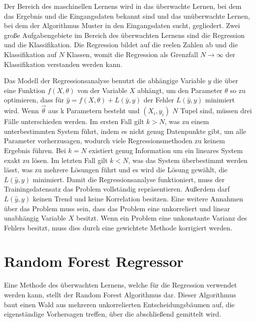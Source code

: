 Der Bereich des maschinellen Lernens wird in das überwachte Lernen, bei dem das Ergebnis und die Eingangsdaten bekannt
sind und das unüberwachte Lernen, bei dem der Algorithmus Muster in den Eingangsdaten sucht, gegliedert.
Zwei große Aufgabengebiete im Bereich des überwachten Lernens sind die Regression und die Klassifikation. Die Regression bildet
auf die reelen Zahlen ab und die Klassifikation auf $N$ Klassen, womit die Regression als Grenzfall $N \to \infty$ der Klassifikation
verstanden werden kann.

Das Modell der Regressionsanalyse benutzt die abhängige Variable $y$ die über eine Funktion $f(X,\theta)$ von der Variable $X$ abhängt, um
den Parameter $\theta$ so zu optimieren, dass für $\hat{y} = f(X,\theta) + L(\hat{y},y)$ der Fehler
$L(\hat{y},y)$ minimiert wird.
Wenn $\vec{\theta}$ aus k Parametern besteht und $(X_i,y_i)$ $N$ Tupel sind, müssen drei Fälle unterschieden werden.
Im ersten Fall gilt $k>N$, was zu einem unterbestimmten System führt, indem es nicht genug Datenpunkte gibt, um alle Parameter
vorherzusagen, wodurch viele Regressionsmethoden zu keinem Ergebnis führen.
Bei $k = N$ existiert genug Information um ein lineares System exakt zu lösen.
Im letzten Fall gilt $k<N$, was das System überbestimmt werden lässt, was zu mehrere Lösungen führt und
es wird die Lösung gewählt, die $L(\hat{y},y)$ minimiert.
Damit die Regressionsanalyse funktioniert, muss der Trainingsdatensatz das Problem vollständig repräsentieren. Außerdem darf $L(\hat{y},y)$ keinen Trend
und keine Korrelation besitzen.
Eine weitere Annahmen über das Problem muss sein, dass das Problem eine unkorreliert und linear unabhängig Variable $X$ besitzt.
Wenn ein Problem eine unkonstante Varianz des Fehlers besitzt, muss dies durch eine gewichtete Methode korrigiert werden.

\section{Random Forest Regressor}
\label{sec:RF}

Eine Methode des überwachten Lernens, welche für die Regression verwendet werden kann, stellt der Random Forest Algorithmus dar. Dieser Algorithmus baut
einen Wald aus mehreren unkorrelierten Entscheidungsbäumen auf, die eigenständige Vorhersagen treffen, über die abschließend gemittelt wird.

